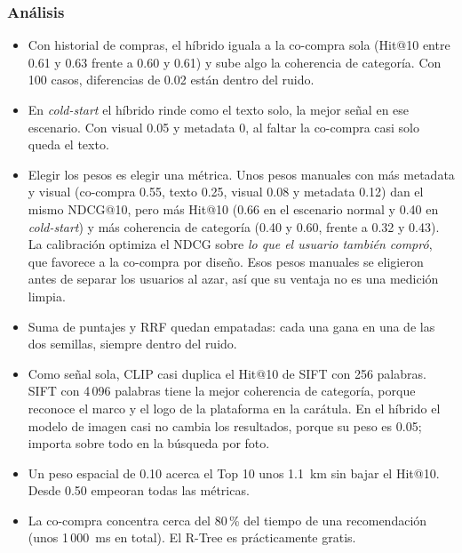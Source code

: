 \subsubsection{Análisis}
\begin{itemize}
  \item Con historial de compras, el híbrido iguala a la co-compra sola (Hit@10 entre 0.61 y 0.63 frente a 0.60 y 0.61) y sube algo la coherencia de categoría. Con 100 casos, diferencias de 0.02 están dentro del ruido.
  \item En \emph{cold-start} el híbrido rinde como el texto solo, la mejor señal en ese escenario. Con visual 0.05 y metadata 0, al faltar la co-compra casi solo queda el texto.
  \item Elegir los pesos es elegir una métrica. Unos pesos manuales con más metadata y visual (co-compra 0.55, texto 0.25, visual 0.08 y metadata 0.12) dan el mismo NDCG@10, pero más Hit@10 (0.66 en el escenario normal y 0.40 en \emph{cold-start}) y más coherencia de categoría (0.40 y 0.60, frente a 0.32 y 0.43). La calibración optimiza el NDCG sobre \emph{lo que el usuario también compró}, que favorece a la co-compra por diseño. Esos pesos manuales se eligieron antes de separar los usuarios al azar, así que su ventaja no es una medición limpia.
  \item Suma de puntajes y RRF quedan empatadas: cada una gana en una de las dos semillas, siempre dentro del ruido.
  \item Como señal sola, CLIP casi duplica el Hit@10 de SIFT con 256 palabras. SIFT con 4\,096 palabras tiene la mejor coherencia de categoría, porque reconoce el marco y el logo de la plataforma en la carátula. En el híbrido el modelo de imagen casi no cambia los resultados, porque su peso es 0.05; importa sobre todo en la búsqueda por foto.
  \item Un peso espacial de 0.10 acerca el Top 10 unos 1.1~km sin bajar el Hit@10. Desde 0.50 empeoran todas las métricas.
  \item La co-compra concentra cerca del 80\,\% del tiempo de una recomendación (unos 1\,000~ms en total). El R-Tree es prácticamente gratis.
\end{itemize}

